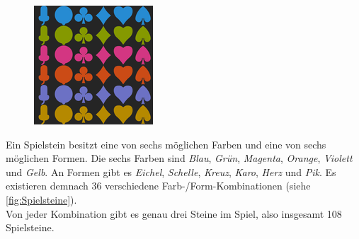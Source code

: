 \documentclass[a4paper, ngerman]{scrartcl}
\begin{document}
\begin{figure}
	\centering
	\includegraphics[scale = 0.45]{images/Spielsteine}
	\caption{}
	\label{fig:Spielsteine}
\end{figure}
Ein Spielstein besitzt eine von sechs möglichen Farben und eine von sechs möglichen Formen. Die sechs Farben sind \emph{Blau},  \emph{Grün}, \emph{Magenta}, \emph{Orange}, \emph{Violett} und \emph{Gelb}. An Formen gibt es \emph{Eichel}, \emph{Schelle}, \emph{Kreuz}, \emph{Karo}, \emph{Herz} und \emph{Pik}.  Es existieren demnach 36 verschiedene Farb-/Form-Kombinationen (siehe \autoref{fig:Spielsteine}).\\
Von jeder Kombination gibt es genau drei Steine im Spiel, also insgesamt 108 Spielsteine.
\newpage
\end{document}
